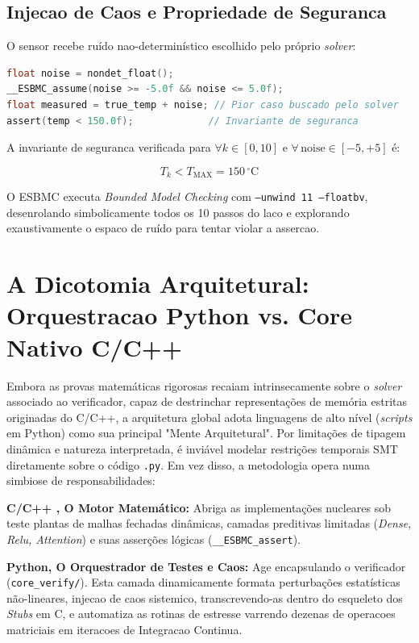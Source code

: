 \subsection{Injecao de Caos e Propriedade de Seguranca}

O sensor recebe ru\'{i}do nao-determin\'{i}stico escolhido pelo pr\'{o}prio \textit{solver}:

\begin{lstlisting}[language=C, numbers=none]
float noise = nondet_float();
__ESBMC_assume(noise >= -5.0f && noise <= 5.0f);
float measured = true_temp + noise; // Pior caso buscado pelo solver
assert(temp < 150.0f);             // Invariante de seguranca
\end{lstlisting}

A invariante de seguranca verificada para $\forall k \in [0, 10]$ e $\forall\,\text{noise} \in [-5, +5]$ \'{e}:

\begin{equation}\label{eq:safety}
T_k < T_{\text{MAX}} = 150\,^{\circ}\text{C}
\end{equation}

O ESBMC executa \textit{Bounded Model Checking} com \texttt{--unwind~11 --floatbv}, desenrolando simbolicamente todos os 10 passos do laco e explorando exaustivamente o espaco de ru\'{i}do para tentar violar a assercao.


\section{A Dicotomia Arquitetural: Orquestracao Python vs. Core Nativo C/C++}

Embora as provas matemáticas rigorosas recaiam intrinsecamente sobre o \textit{solver} associado ao verificador, capaz de destrinchar representações de memória estritas originadas do C/C++, a arquitetura global adota linguagens de alto nível (\textit{scripts} em Python) como sua principal "Mente Arquitetural". Por limitações de tipagem dinâmica e natureza interpretada, é inviável modelar restrições temporais SMT diretamente sobre o código \texttt{.py}. Em vez disso, a metodologia opera numa simbiose de responsabilidades:

\begin{alineas}
    \item \textbf{C/C++ , O Motor Matemático:} Abriga as implementações nucleares sob teste   plantas de malhas fechadas dinâmicas, camadas preditivas limitadas (\textit{Dense, Relu, Attention}) e suas asserções lógicas (\texttt{\_\_ESBMC\_assert}).
    \item \textbf{Python, O Orquestrador de Testes e Caos:} Age encapsulando o verificador (\texttt{core\_verify/}). Esta camada dinamicamente formata perturbações estatísticas não-lineares, injecao de caos sistemico, transcrevendo-as dentro do esqueleto dos \textit{Stubs} em C, e automatiza as rotinas de estresse varrendo dezenas de operacoes matriciais em iteracoes de Integracao Continua.
\end{alineas}

